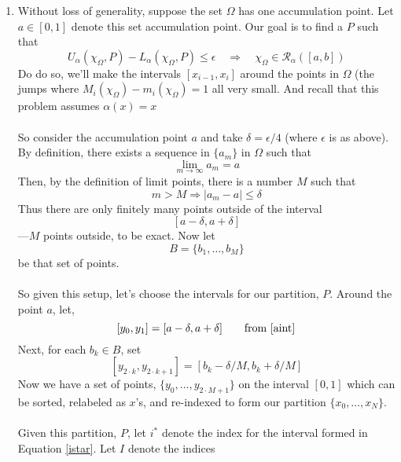 \documentclass[12pt]{article}
\theoremstyle{plain}
\theoremstyle{definition}
\theoremstyle{remark}
\begin{document}
\begin{enumerate}
\item Without loss of generality, suppose the set $\Omega$ 
    has one accumulation point. Let 
    $a \in [0,1]$ denote this set 
    accumulation point. Our goal is to find a $P$ such
    that
        \[ U_\alpha(\chi_\Omega, P) - L_\alpha(\chi_\Omega, P) 
            \leq \epsilon \quad \Rightarrow \quad 
            \chi_\Omega \in \mathscr{R}_\alpha([a,b])\]
    Do do so, we'll make the intervals $[x_{i-1}, x_i]$ 
    around the points in $\Omega$ (the jumps where 
    $M_i(\chi_\Omega) - m_i(\chi_\Omega)= 1$ all 
    very small.  
    And recall that this problem assumes $\alpha(x) = x$
    \\
    \\
    So consider the accumulation point $a$ and 
    take $\delta=\epsilon/4$ (where $\epsilon$ is 
    as above). By definition,
    there exists a sequence in $\{a_m\}$ in $\Omega$
    such that 
        \[ \lim_{m\rightarrow \infty} a_m = a \]
    Then, by the definition of limit points, there is
    a number $M$ such that 
        \[ m>M \Rightarrow |a_m - a|\leq \delta \]
    Thus there are only finitely many points 
    outside of the interval 
    \begin{equation} 
        \label{aint}
        [a-\delta, a+\delta]
    \end{equation} 
    ---$M$ points outside, to be exact.
    Now let 
        \[ B = \{b_1, \ldots, b_M\} \]
    be that set of points. 
    \\
    \\
    So given this setup, let's choose the intervals 
    for our partition, $P$.  Around the point $a$, 
    let, 
    \begin{equation}
        \label{istar}
         [y_0, y_1] = [a-\delta, a + \delta]
            \qquad \text{from \ref{aint}} 
    \end{equation}
    Next, for each $b_k \in B$, set 
    \begin{equation}
        \label{bigI}
         [y_{2\cdot k }, y_{2\cdot k+1}] = 
            [b_k - \delta/M, b_k + \delta/M ]
    \end{equation}
    Now we have a set of points, $\{y_0, \ldots, 
    y_{2\cdot M+1}\}$ on the 
    interval $[0,1]$ which can be sorted,
    relabeled as $x$'s, and re-indexed to
    form our partition $\{x_0, \ldots, x_N\}$.
    \\
    \\
    Given this partition, $P$, let $i^*$ denote
    the index for the interval formed in 
    Equation \ref{istar}. Let $I$ denote the indices 

\end{enumerate}
\end{document}
